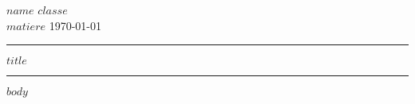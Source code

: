 \documentclass[twoside, 11pt]{article}
\begin{document}
$name$ \hfill $classe$ \\
$matiere$ \hfill \today\\
\hrule
\vspace{0.1cm}
\begin{center}
\large $title$
\end{center}
\vspace{0.1cm}
\hrule


  $body$


  
\end{document}
